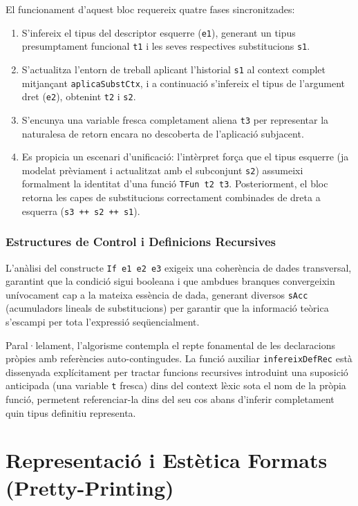 El funcionament d'aquest bloc requereix quatre fases sincronitzades:
\begin{enumerate}
    \item S'infereix el tipus del descriptor esquerre (\texttt{e1}), generant un tipus presumptament funcional \texttt{t1} i les seves respectives substitucions \texttt{s1}.
    \item S'actualitza l'entorn de treball aplicant l'historial \texttt{s1} al context complet mitjançant \texttt{aplicaSubstCtx}, i a continuació s'infereix el tipus de l'argument dret (\texttt{e2}), obtenint \texttt{t2} i \texttt{s2}.
    \item S'encunya una variable fresca completament aliena \texttt{t3} per representar la naturalesa de retorn encara no descoberta de l'aplicació subjacent.
    \item Es propicia un escenari d'unificació: l'intèrpret força que el tipus esquerre (ja modelat prèviament i actualitzat amb el subconjunt \texttt{s2}) assumeixi formalment la identitat d'una funció \texttt{TFun t2 t3}. Posteriorment, el bloc retorna les capes de substitucions correctament combinades de dreta a esquerra (\texttt{s3 ++ s2 ++ s1}).
\end{enumerate}

\subsubsection{Estructures de Control i Definicions Recursives}

L'anàlisi del constructe \texttt{If e1 e2 e3} exigeix una coherència de dades transversal, garantint que la condició sigui booleana i que ambdues branques convergeixin unívocament cap a la mateixa essència de dada, generant diversos \texttt{sAcc} (acumuladors lineals de substitucions) per garantir que la informació teòrica s'escampi per tota l'expressió seqüencialment.

Paral·lelament, l'algorisme contempla el repte fonamental de les declaracions pròpies amb referències auto-contingudes. La funció auxiliar \texttt{infereixDefRec} està dissenyada explícitament per tractar funcions recursives introduint una suposició anticipada (una variable \texttt{t} fresca) dins del context lèxic sota el nom de la pròpia funció, permetent referenciar-la dins del seu cos abans d'inferir completament quin tipus definitiu representa. 

\section{Representació i Estètica Formats (Pretty-Printing)}


